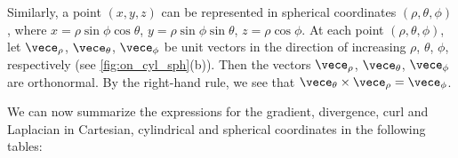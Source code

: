 Similarly, a point $(x,y,z)$ can be represented in spherical coordinates $(\rho, \theta , \phi)$, where $x=\rho\sin \phi \cos \theta$, $y=\rho\sin \phi \sin \theta$, $z=\rho\cos \phi$. At each point $(\rho, \theta , \phi)$, let $\vece_{\rho}$, $\vece_{\theta}$, $\vece_{\phi}$ be unit vectors in the direction of increasing $\rho$, $\theta$, $\phi$, respectively (see \autoref{fig:on_cyl_sph}(b)). Then the vectors $\vece_{\rho}$, $\vece_{\theta}$, $\vece_{\phi}$ are orthonormal. By the right-hand rule, we see that $\vece_{\theta}\times\vece_{\rho}=\vece_{\phi}$.

We can now summarize the expressions for the gradient, divergence, curl and Laplacian in Cartesian, cylindrical and spherical coordinates in the following tables:


